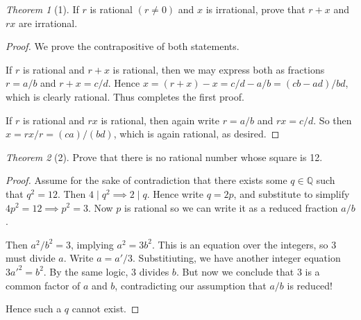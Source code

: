 \documentclass[12pt]{article}
\theoremstyle{remark}
\theoremstyle{named}
\newtheorem*{theorem}{Theorem}
\begin{document}
\begin{theorem}[1]
    If $r$ is rational $(r \neq 0)$ and $x$ is irrational, prove that $r + x$ and $rx$ are irrational.
\end{theorem}

\begin{proof}
    We prove the contrapositive of both statements. 

    If $r$ is rational and $r + x$ is rational, then we may express both as fractions $r = a / b$ and $r + x = c / d$. Hence $x = (r + x) - x = c / d - a / b = (cb - ad) / bd$, which is clearly rational. Thus completes the first proof.
    
    If $r$ is rational and $rx$ is rational, then again write $r = a / b$ and $rx = c/d$. So then $x = rx / r = (ca)/(bd)$, which is again rational, as desired.
\end{proof}

\begin{theorem}[2]
    Prove that there is no rational number whose square is 12.
\end{theorem}

\begin{proof}
    Assume for the sake of contradiction that there exists some $q \in \mathbb Q$ such that $q^2 = 12$. Then $4 \mid q^2 \implies 2 \mid q$. Hence write $q = 2p$, and substitute to simplify $4p^2 = 12 \implies p^2 = 3$. Now $p$ is rational so we can write it as a reduced fraction $a / b$. 

    Then $a^2/b^2= 3$, implying $a^2= 3b^2$. This is an equation over the integers, so 3 must divide $a$. Write $a = a'/3$. Substitiuting, we have another integer equation $3a'^2= b^2$. By the same logic, 3 divides $b$. But now we conclude that 3 is a common factor of $a$ and $b$, contradicting our assumption that $a/b$ is reduced!
    
    Hence such a $q$ cannot exist.
\end{proof}
\end{document}

